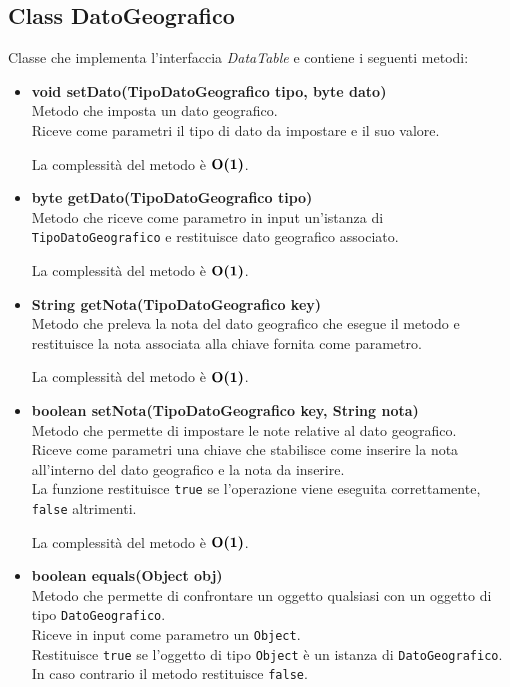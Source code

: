 \documentclass[a4paper, 12pt]{scrreprt}
\begin{document}
			\subsection{Class DatoGeografico}
			Classe che implementa l'interfaccia \textsl{DataTable} e contiene i seguenti metodi:
			\begin{itemize}
				\item \textbf{void setDato(TipoDatoGeografico tipo, byte dato)}
				\\Metodo che imposta un dato geografico.
				\\Riceve come parametri il tipo di dato da impostare e il suo valore.
				
				La complessit\`a del metodo \`e $\mathbf{O}\textbf{(1)}$.
				
				\item \textbf{byte getDato(TipoDatoGeografico tipo)}
				\\Metodo che riceve come parametro in input un'istanza di \verb!TipoDatoGeografico! e restituisce dato geografico associato.
				
				La complessit\`a del metodo \`e $\mathbf{O}\textbf{(1)}$.
				
				\item \textbf{String getNota(TipoDatoGeografico key)}
				\\Metodo che preleva la nota del dato geografico che esegue il metodo e restituisce la nota associata alla chiave fornita come parametro.
				
				La complessit\`a del metodo \`e $\mathbf{O}\textbf{(1)}$.
				
				\item \textbf{boolean setNota(TipoDatoGeografico key, String nota)}
				\\Metodo che permette di impostare le note relative al dato geografico.
				\\Riceve come parametri una chiave che stabilisce come inserire la nota all'interno del dato geografico e la nota da inserire.
				\\La funzione restituisce \verb!true! se l'operazione viene eseguita correttamente, \verb!false! altrimenti.
				
				La complessit\`a del metodo \`e $\mathbf{O}\textbf{(1)}$.
				
				\item \textbf{boolean equals(Object obj)}
				\\Metodo che permette di confrontare un oggetto qualsiasi con un oggetto di tipo \verb!DatoGeografico!.
				\\Riceve in input come parametro un \verb!Object!.
				\\Restituisce \verb!true! se l'oggetto di tipo \verb!Object! \`e un istanza di \verb!DatoGeografico!.
				\\In caso contrario il metodo restituisce \verb!false!.
				

\end{itemize}
\end{document}
